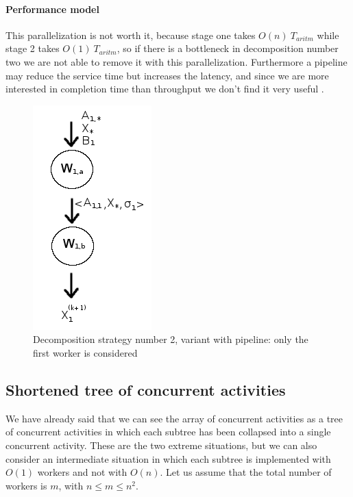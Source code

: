 \documentclass{article}
\begin{document}
\paragraph{Performance model} This parallelization is not worth it, because stage one takes $O(n) \: T_{aritm}$ while stage 2 takes $O(1) \: T_{aritm}$, so if there is a bottleneck in decomposition number two we are not able to remove it with this parallelization. Furthermore a pipeline may reduce the service time but increases the latency, and since we are more interested in completion time than throughput we don't find it very useful    . \\

\begin{figure}[h]
\centering
\includegraphics[scale=0.48]{single_worker_pipe}
\caption{Decomposition strategy number 2, variant with pipeline: only the first worker is considered}
\label{fig:w_pipe}
\end{figure} 

\subsection{Shortened tree of concurrent activities}
We have already said that we can see the array of concurrent activities as a tree of concurrent activities in which each subtree has been collapsed into a single concurrent activity. These are the two extreme situations, but we can also consider an intermediate situation in which each subtree is implemented with $O(1)$ workers and not with $O(n)$. Let us assume that the total number of workers is $m$, with $n \leq m \leq n^2$. 
\end{document}
